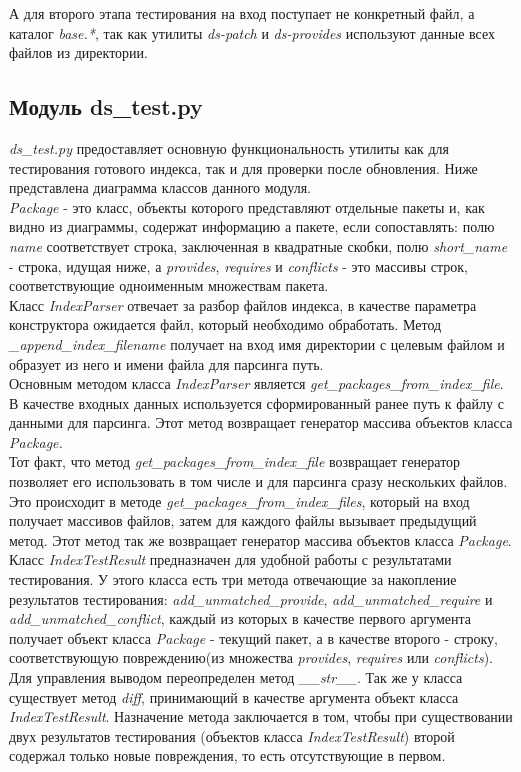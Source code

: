 А для второго этапа тестирования на вход поступает не конкретный файл, а
каталог \textit{base.*}, так как утилиты \textit{ds-patch} и \textit{ds-provides} используют данные
всех файлов из директории.\\

\subsection{Модуль ds\_test.py}
\textit{ds\_test.py} предоставляет основную функциональность утилиты  как для тестирования
готового индекса, так и для проверки после обновления. Ниже представлена диаграмма
классов данного модуля.\\
\textit{Package} - это класс, объекты которого представляют отдельные пакеты и, как видно из диаграммы,
содержат информацию а пакете, если сопоставлять: полю \textit{name} соответствует строка, заключенная
в квадратные скобки, полю \textit{short\_name} - строка, идущая ниже, а \textit{provides}, \textit{requires}
и \textit{conflicts} - это массивы строк, соответствующие одноименным множествам пакета. \\

Класс \textit{IndexParser} отвечает за разбор файлов индекса, в качестве параметра конструктора
ожидается файл, который необходимо обработать. Метод \textit{\_append\_index\_filename} получает на вход
имя директории с целевым файлом и образует из него и имени файла для парсинга
путь.\\
Основным методом класса \textit{IndexParser} является \textit{get\_packages\_from\_index\_file}.
В качестве входных данных используется сформированный ранее путь к файлу с данными
для парсинга. Этот метод возвращает генератор массива объектов класса \textit{Package.}\\

Тот факт, что метод \textit{get\_packages\_from\_index\_file} возвращает генератор позволяет
его использовать в том числе и для парсинга сразу нескольких файлов. Это происходит
в методе \textit{get\_packages\_from\_index\_files}, который на вход получает массивов файлов, 
затем для каждого файлы вызывает предыдущий метод. Этот метод так же возвращает
генератор массива объектов класса \textit{Package}.\\

Класс \textit{IndexTestResult} предназначен для удобной работы с результатами тестирования. 
У этого класса есть три метода отвечающие за накопление результатов тестирования:
\textit{add\_unmatched\_provide}, \textit{add\_unmatched\_require} и \textit{add\_unmatched\_conflict}, каждый из которых
в качестве первого аргумента получает объект класса \textit{Package} - текущий пакет, а в качестве второго
- строку, соответствующую повреждению(из множества \textit{provides}, \textit{requires} или \textit{conflicts}).
Для управления выводом переопределен метод \textit{\_\_str\_\_}. Так же у класса существует метод \textit{diff},
принимающий в качестве аргумента объект класса \textit{IndexTestResult}. Назначение метода 
заключается в том, чтобы при существовании двух результатов тестирования (объектов
класса \emph{IndexTestResult}) второй содержал только новые повреждения, то есть отсутствующие
в первом.\\

